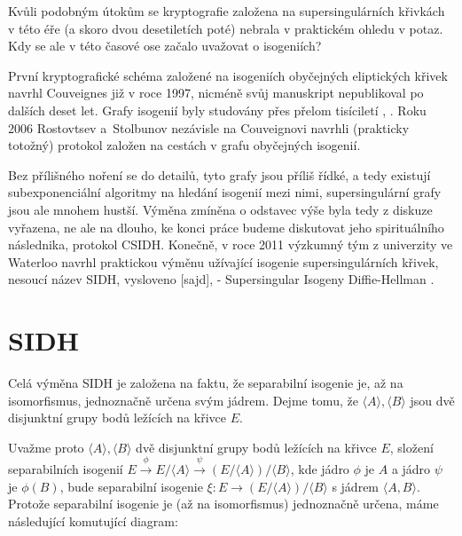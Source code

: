 \documentclass[12pt]{report}
\begin{document}
Kvůli podobným útokům se kryptografie založena na supersingulárních křivkách v této éře (a skoro dvou desetiletích poté) nebrala v praktickém ohledu v potaz. Kdy se ale v této časové ose začalo uvažovat o isogeniích?

První kryptografické schéma založené na isogeniích obyčejných eliptických křivek navrhl Couveignes \cite{Couveignes} již v roce 1997, nicméně svůj manuskript nepublikoval po dalších deset let. Grafy isogenií byly studovány přes přelom tisíciletí \cite{Galbraith}, \cite{Galbraith2}. Roku 2006 Rostovtsev a~Stolbunov \cite{Stolbunov} nezávisle na Couveignovi navrhli (prakticky totožný) protokol založen na cestách v grafu obyčejných isogenií. 

Bez přílišného noření se do detailů, tyto grafy jsou příliš řídké, a tedy existují subexponenciální algoritmy \cite{Galbraith3} na hledání isogenií mezi nimi, supersingulární grafy jsou ale mnohem hustší. Výměna zmíněna o odstavec výše byla tedy z diskuze vyřazena, ne ale na dlouho, ke konci práce budeme diskutovat jeho spirituálního následnika, protokol CSIDH. Konečně, v roce 2011 výzkumný tým z univerzity ve Waterloo navrhl praktickou výměnu užívající isogenie supersingulárních křivek, nesoucí název SIDH, vysloveno [sajd], - Supersingular Isogeny Diffie-Hellman \cite{DeFeo3}.

\section{SIDH}

Celá výměna SIDH je založena na faktu, že separabilní isogenie je, až na isomorfismus, jednoznačně určena svým jádrem. Dejme tomu, že $\langle A \rangle, \langle B \rangle$ jsou dvě disjunktní grupy bodů ležících na křivce $E$.

 Uvažme proto $\langle A \rangle,\langle B \rangle$ dvě disjunktní grupy bodů ležících na křivce $E$, složení separabilních isogenií $E \stackrel{\phi}{\longrightarrow} E/\langle A \rangle \stackrel{\psi}{\longrightarrow} (E / \langle A \rangle)/\langle B \rangle$, kde jádro $\phi$ je $A$ a jádro $\psi$ je $\phi (B)$, bude separabilní isogenie $\xi : E \longrightarrow (E / \langle A \rangle)/\langle B \rangle$ s jádrem $\langle A,B \rangle$. Protože separabilní isogenie je (až na isomorfismus) jednoznačně určena, máme následující komutující diagram:

\begin{figure}[h]
\begin{center} 
\end{center}
\end{figure}
\end{document}
